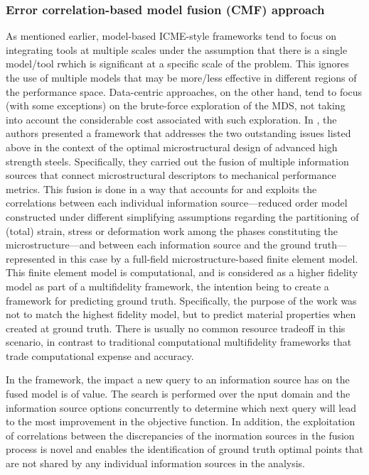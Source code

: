 \documentclass[utf8]{frontiersSCNS} %
\begin{document}
\subsubsection{Error correlation-based model fusion (CMF) approach}
As mentioned earlier, model-based ICME-style frameworks tend to focus on integrating tools at multiple scales under the assumption that there is a single model/tool rwhich is significant at a specific scale of the problem. This ignores the use of multiple models that may be more/less effective in different regions of the performance space. Data-centric approaches, on the other hand, tend to focus (with some exceptions) on the brute-force exploration of the MDS, not taking into account the considerable cost associated with such exploration.
In \cite{ghoreishi2018multi}, the authors presented a framework that addresses the two outstanding issues listed above in the context of the optimal microstructural design of advanced high strength steels. Specifically, they carried out the fusion of multiple information sources that connect microstructural descriptors to mechanical performance metrics. This fusion is done in a way that accounts for and exploits the correlations between each individual information source—reduced order model constructed under different simplifying assumptions regarding the partitioning of (total) strain, stress or deformation work among the phases constituting the microstructure—and between each information source and the ground truth—represented in this case by a full-field microstructure-based finite element model. This finite element model is computational, and is considered as a higher fidelity model as part of a multifidelity framework, the intention being to create a framework for predicting ground truth. Specifically, the purpose of the work was not to  match the highest fidelity model, but to predict material properties when created at ground truth. There is usually no common resource tradeoff in this scenario, in contrast to traditional computational multifidelity frameworks that trade computational expense and accuracy. 

In the framework, the impact a new query to an information source has on the fused model is of value. The search is performed over the nput domain and the information source options concurrently to determine which next query will lead to the most improvement in the objective function. In addition, the exploitation of correlations between the discrepancies of the inormation sources in the fusion process is novel and enables the identification of ground truth optimal points that are not shared by any individual information sources in the analysis.
\end{document}
